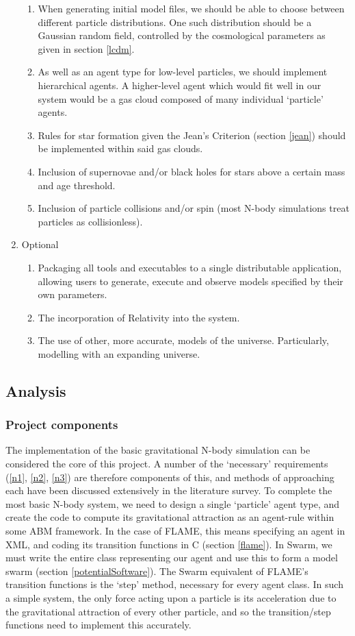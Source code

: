 \documentclass[11pt,a4paper]{article}
\begin{document}
\begin{enumerate}
\begin{enumerate}
    \item When generating initial model files, we should be able to choose between different particle distributions. One such distribution should be a Gaussian random field, controlled by the cosmological parameters as given in section \ref{lcdm}. \label{d3}
    \item As well as an agent type for low-level particles, we should implement hierarchical agents. A higher-level agent which would fit well in our system would be a gas cloud composed of many individual `particle' agents.
    \item Rules for star formation given the Jean's Criterion (section \ref{jean}) should be implemented within said gas clouds.
    \item Inclusion of supernovae and/or black holes for stars above a certain mass and age threshold.
    \item Inclusion of particle collisions and/or spin (most N-body simulations treat particles as collisionless).
  \end{enumerate}
  \item{Optional}
  \begin{enumerate}
    \item Packaging all tools and executables to a single distributable application, allowing users to generate, execute and observe models specified by their own parameters.
    \item The incorporation of Relativity into the system.
    \item The use of other, more accurate, models of the universe. Particularly, modelling with an expanding universe.
  \end{enumerate}
\end{enumerate}

\subsection{Analysis}
\subsubsection{Project components}
The implementation of the basic gravitational N-body simulation can be considered the core of this project. A number of the `necessary' requirements (\ref{n1}, \ref{n2}, \ref{n3}) are therefore components of this, and methods of approaching each have been discussed extensively in the literature survey. To complete the most basic N-body system, we need to design a single `particle' agent type, and create the code to compute its gravitational attraction as an agent-rule within some ABM framework. In the case of FLAME, this means specifying an agent in XML, and coding its transition functions in C (section \ref{flame}). In Swarm, we must write the entire class representing our agent and use this to form a model swarm (section \ref{potentialSoftware}). The Swarm equivalent of FLAME's transition functions is the `step' method, necessary for every agent class. In such a simple system, the only force acting upon a particle is its acceleration due to the gravitational attraction of every other particle, and so the transition/step functions need to implement this accurately.
\end{document}
